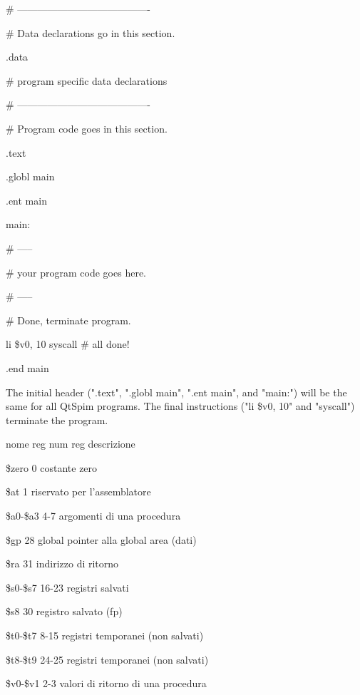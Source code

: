 \documentclass{article} %
\begin{document}
\noindent \# ---------------------------------------- 

\noindent \# Data declarations go in this section.

 .data 

\noindent \# program specific data declarations 

\noindent \# ---------------------------------------- 

\noindent \# Program code goes in this section. 

\noindent .text 

  .globl  main 

  .ent  main 

\noindent main: 

\noindent \# ----- 

\noindent \# your program code goes here. 

\noindent \# ----- 

\noindent \# Done, terminate program. 

li \$v0, 10 syscall  \# all done!

 .end main 

\noindent 

\noindent 

\noindent The initial header (".text", ".globl main", ".ent main", and "main:") will be the same for all QtSpim programs. The final instructions ("li \$v0, 10" and "syscall") terminate the program.

\noindent 

\noindent 

\noindent nome reg num reg descrizione

\noindent \$zero   0   costante zero 

\noindent \$at   1   riservato per l'assemblatore 

\noindent \$a0-\$a3  4-7   argomenti di una procedura 

\noindent \$gp   28   global pointer alla global area (dati) 

\noindent \$ra   31   indirizzo di ritorno

\noindent \$s0-\$s7  16-23   registri salvati 

\noindent \$s8   30   registro salvato (fp) 

\noindent \$t0-\$t7   8-15   registri temporanei (non salvati) 

\noindent \$t8-\$t9   24-25   registri temporanei (non salvati)

\noindent \$v0-\$v1  2-3   valori di ritorno di una procedura 
\end{document}
